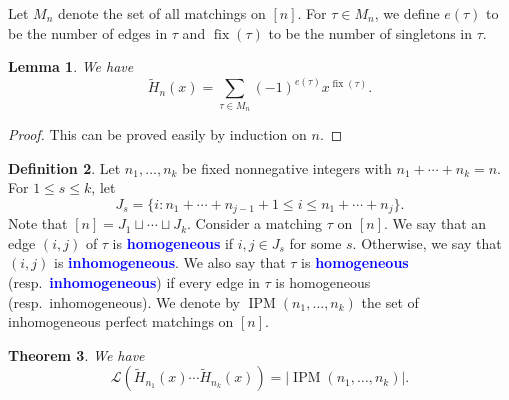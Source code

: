 \documentclass[oneside]{book}
\numberwithin{equation}{section}
\newtheorem{thm}{Theorem}[section]
\newtheorem{lem}[thm]{Lemma}
\theoremstyle{definition}
\newtheorem{defn}[thm]{Definition}
\newcommand\IPM{\operatorname{IPM}}
\newcommand\fix{\operatorname{fix}}
\newcommand\LL{\mathcal{L}}
\renewcommand\emph[1]{\textcolor{blue}{\bf #1}}
\begin{document}
Let \( M_n \) denote the set of all matchings on \( [n] \). For
\( \tau\in M_n \), we define \( e(\tau) \) to be the number of edges
in \( \tau \) and \( \fix(\tau) \) to be the number of singletons in
\( \tau \).

\begin{lem}\label{lem:10}
  We have
  \[
    \widetilde{H}_n(x) = \sum_{\tau\in M_n} (-1)^{e(\tau)} x^{\fix(\tau)}.
  \]
\end{lem}

\begin{proof}
  This can be proved easily by induction on \( n \).
\end{proof}

\begin{defn}\label{def:10}
  Let \( n_1,\dots,n_k \) be fixed nonnegative integers with
\( n_1 + \cdots + n_k = n \). For \( 1\le s\le k \), let
\[
  J_s = \{ i: n_1 + \cdots + n_{j-1}+1 \le i\le n_1 + \cdots + n_j\}.
\]
Note that \( [n] = J_1 \sqcup \cdots \sqcup J_k \). Consider a
matching \( \tau \) on \( [n] \). We say that an edge \( (i,j) \) of
\( \tau \) is \emph{homogeneous} if \( i,j\in J_s \) for some \( s \).
Otherwise, we say that \( (i,j) \) is \emph{inhomogeneous}. We also
say that \( \tau \) is \emph{homogeneous} (resp.~\emph{inhomogeneous})
if every edge in \( \tau \) is homogeneous (resp.~inhomogeneous). We
denote by \( \IPM(n_1,\dots,n_k) \) the set of inhomogeneous perfect
matchings on \( [n] \).
\end{defn}


\begin{thm}
  We have
\[
  \LL(\widetilde{H}_{n_1}(x)\cdots \widetilde{H}_{n_k}(x))
  = |\IPM(n_1,\dots,n_k)|.
\]
\end{thm}
\end{document}
